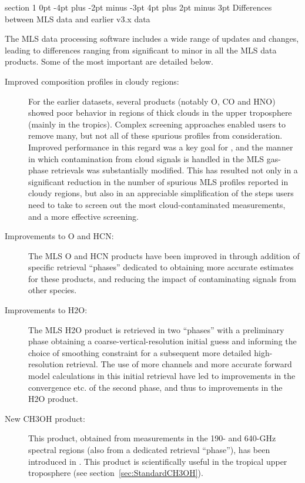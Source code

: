 \documentclass[11pt,draft]{report}
\makeatletter
\renewcommand{\section}{\@startsection%
  {section}%
  {1}%
  {0pt}%
  {-4pt plus -2pt minus -3pt}%
  {4pt plus 2pt minus 3pt}%
  {\Large\sffamily\fontseries{sb}\selectfont\flushleft\color{SectionColor}\figureversion{tabular}}}%
\makeatother
\begin{document}
\section{Differences between MLS \thisv data and earlier v3.x data}
\label{sec:V4vsV3Overview}

The MLS \thisv data processing software includes a wide range of updates
and changes, leading to differences ranging from significant to minor in
all the MLS data products.  Some of the most important are detailed
below.

\begin{description}
\item[Improved composition profiles in cloudy regions:] For the earlier
  \prevv datasets, several products (notably O, CO and HNO)
  showed poor behavior in regions of thick clouds in the upper
  troposphere (mainly in the tropics).  Complex screening approaches
  enabled users to remove many, but not all of these spurious profiles
  from consideration.  Improved performance in this regard was a key
  goal for \thisv, and the manner in which contamination from cloud
  signals is handled in the MLS gas-phase retrievals was substantially
  modified.  This has resulted not only in a significant reduction in
  the number of spurious MLS profiles reported in cloudy regions, but
  also in an appreciable simplification of the steps users need to take
  to screen out the most cloud-contaminated measurements, and a more
  effective screening.

\item[Improvements to O and HCN:] The MLS O and HCN products
  have been improved in \thisv through addition of specific retrieval
  ``phases'' dedicated to obtaining more accurate estimates for these
  products, and reducing the impact of contaminating signals from other
  species.

\item[Improvements to H\cs2O:] The MLS H\cs2O product is retrieved in
  two ``phases'' with a preliminary phase obtaining a
  coarse-vertical-resolution initial guess and informing the choice of
  smoothing constraint for a subsequent more detailed high-resolution
  retrieval.  The use of more channels and more accurate forward model
  calculations in this initial retrieval have led to improvements in the
  convergence etc. of the second phase, and thus to improvements in the
  H\cs2O product.

\item[New CH\cs3OH product:] This product, obtained from measurements in
  the 190- and 640-GHz spectral regions (also from a dedicated retrieval
  ``phase''), has been introduced in \thisv.  This product is
  scientifically useful in the tropical upper troposphere (see
  section~\ref{sec:StandardCH3OH}).


\end{description}
\end{document}
